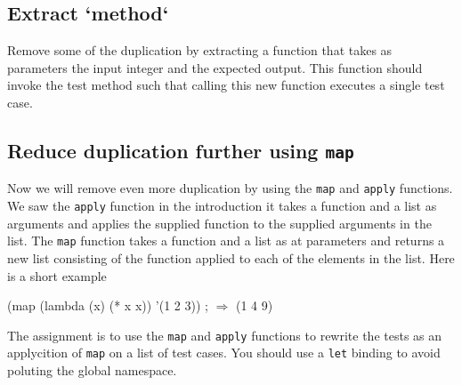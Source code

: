 \documentclass[12pt,a4paper,english,twoside]{article}
\begin{document}
\subsection{Extract `method`}
Remove some of the duplication by extracting a function that takes as 
parameters the input integer and the expected output. This function should 
invoke the test method such that calling this new function executes a 
single test case.
\subsection{Reduce duplication further using \texttt{map}}
Now we will remove even more duplication by using the \texttt{map} and 
\texttt{apply} functions. We saw the \texttt{apply} function in the 
introduction it takes a function and a list as arguments and applies the 
supplied function to the supplied arguments in the list. The \texttt{map} 
function takes a function and a list as at parameters and returns a new list 
consisting of the function applied to each of the elements in the list.
Here is a short example
\begin{schemecode}
(map (lambda (x) (* x x)) '(1 2 3)) ; $\Rightarrow$ (1 4 9)
\end{schemecode}
The assignment is to use the \texttt{map} and \texttt{apply} functions to 
rewrite the tests as an applycition of \texttt{map} on a list of test cases.
You should use a \texttt{let} binding to avoid poluting the global namespace.
 
\end{document}
